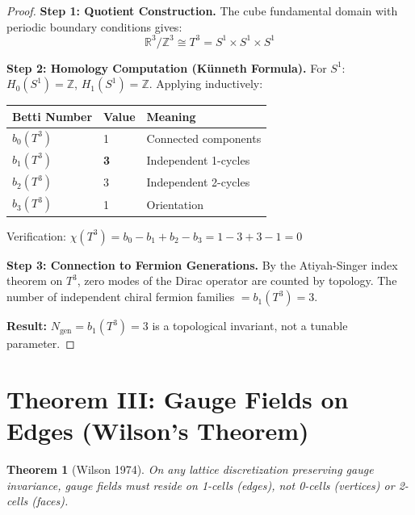 \documentclass[11pt,a4paper]{article}
\theoremstyle{plain}
\newtheorem{theorem}{Theorem}[section]
\theoremstyle{definition}
\theoremstyle{remark}
\newcommand{\Ngen}{N_{\text{gen}}}
\begin{document}
\begin{proof}
\textbf{Step 1: Quotient Construction.} The cube fundamental domain with periodic boundary conditions gives:
\[
\mathbb{R}^3/\mathbb{Z}^3 \cong T^3 = S^1 \times S^1 \times S^1
\]

\textbf{Step 2: Homology Computation (K\"unneth Formula).} For $S^1$: $H_0(S^1) = \mathbb{Z}$, $H_1(S^1) = \mathbb{Z}$. Applying inductively:

\begin{center}
\begin{tabular}{lll}
\toprule
\textbf{Betti Number} & \textbf{Value} & \textbf{Meaning} \\
\midrule
$b_0(T^3)$ & 1 & Connected components \\
$b_1(T^3)$ & \textbf{3} & Independent 1-cycles \\
$b_2(T^3)$ & 3 & Independent 2-cycles \\
$b_3(T^3)$ & 1 & Orientation \\
\bottomrule
\end{tabular}
\end{center}

Verification: $\chi(T^3) = b_0 - b_1 + b_2 - b_3 = 1 - 3 + 3 - 1 = 0$ \checkmark

\textbf{Step 3: Connection to Fermion Generations.} By the Atiyah-Singer index theorem on $T^3$, zero modes of the Dirac operator are counted by topology. The number of independent chiral fermion families $= b_1(T^3) = 3$.

\textbf{Result:} $\Ngen = b_1(T^3) = 3$ is a topological invariant, not a tunable parameter.
\end{proof}

\section{Theorem III: Gauge Fields on Edges (Wilson's Theorem)}

\begin{theorem}[Wilson 1974]
On any lattice discretization preserving gauge invariance, gauge fields must reside on 1-cells (edges), not 0-cells (vertices) or 2-cells (faces).
\end{theorem}
\end{document}
